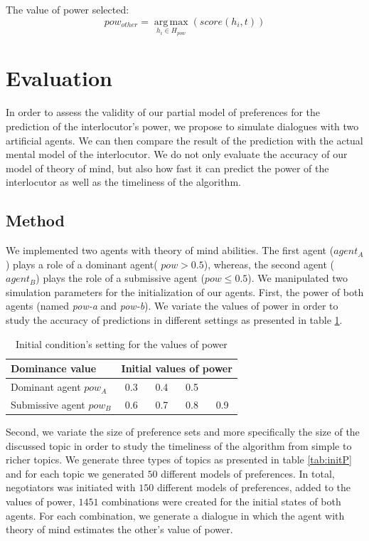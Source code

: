 \documentclass[sigconf]{aamas}  %
\begin{document}
	The value of power selected:
	\begin{equation}
	pow_{other} = \operatorname*{arg\,max}_{h_i \in H_{pow}} ( score(h_i,t))
	\end{equation}
	
	
	\section{Evaluation}
	In order to assess the validity of our partial model of preferences for the prediction of the interlocutor's power, we propose to simulate dialogues with two artificial agents. We can then compare the result of the prediction with the actual mental model of the interlocutor. We do not only evaluate the accuracy of our model of theory of mind, but also how fast it can predict the power of the interlocutor as well as the timeliness of the algorithm.
	
	\subsection{Method}
	We implemented two agents with theory of mind abilities.
	The first agent ($agent_A$) plays a role of a dominant agent( $pow > 0.5$), whereas, the second agent ($agent_B$) plays the role of a submissive agent ($pow \leq 0.5$). 
	We manipulated two simulation parameters for the initialization of our agents. First, the power of both agents (named \emph{pow-a} and \emph{pow-b}). We variate the values of power in order to study the accuracy of predictions in different settings as presented in table \ref{tab:powsettings}.
		\begin{table}[t]
			\centering
			\caption{Initial condition's setting for the values of power} 
			\begin{tabular}{|l|cccc|}
				\hline 
				\textbf{Dominance value } &	\multicolumn{4}{c|}{ Initial values of power } \\
				\hline
				Dominant agent $pow_A$ & 0.3 & 0.4 & 0.5 &  \\
				\hline
				Submissive agent $pow_B$ & 0.6 & 0.7 & 0.8 & 0.9\\
				\hline
			\end{tabular}
			
			\label{tab:powsettings}
		\end{table}
		
	Second, we variate the size of preference sets and more specifically the size of the discussed topic in order to study the timeliness of the algorithm from simple to richer topics. We generate three types of topics as presented in table \ref{tab:initP} and for each topic we generated $50$ different models of preferences. In total, negotiators was initiated with $150$ different models of preferences, added to the values of power,  $1451$ combinations were created for the initial states of both agents. For each combination, we generate a dialogue in which the agent with theory of mind estimates the other's value of power.
\end{document}
